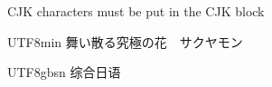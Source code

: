 CJK characters must be put in the CJK block

\begin{CJK}{UTF8}{min}
舞い散る究極の花　サクヤモン
\end{CJK}

\begin{CJK}{UTF8}{gbsn}
综合日语
\end{CJK}
